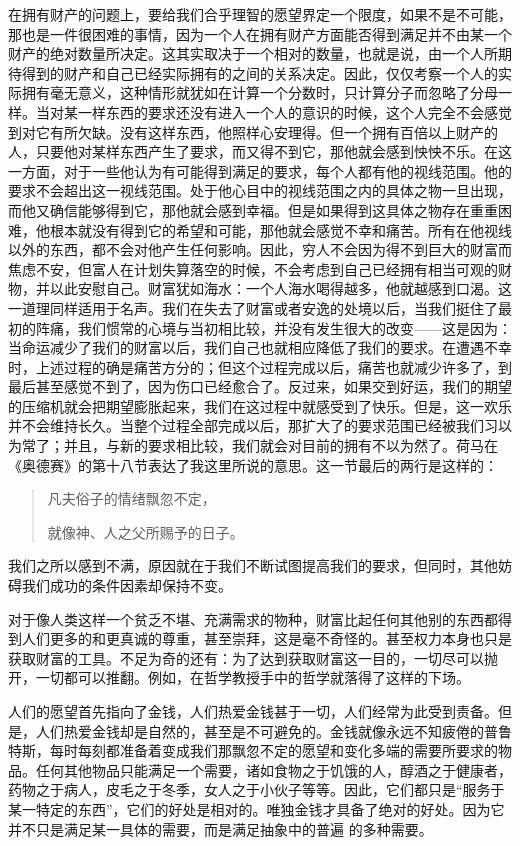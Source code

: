 \documentclass[12pt,oneside]{book}
\begin{document}
在拥有财产的问题上，要给我们合乎理智的愿望界定一个限度，如果不是不可能，那也是一件很困难的事情，因为一个人在拥有财产方面能否得到满足并不由某一个财产的绝对数量所决定。这其实取决于一个相对的数量，也就是说，由一个人所期待得到的财产和自己已经实际拥有的之间的关系决定。因此，仅仅考察一个人的实际拥有毫无意义，这种情形就犹如在计算一个分数时，只计算分子而忽略了分母一样。当对某一样东西的要求还没有进入一个人的意识的时候，这个人完全不会感觉到对它有所欠缺。没有这样东西，他照样心安理得。但一个拥有百倍以上财产的人，只要他对某样东西产生了要求，而又得不到它，那他就会感到怏怏不乐。在这一方面，对于一些他认为有可能得到满足的要求，每个人都有他的视线范围。他的要求不会超出这一视线范围。处于他心目中的视线范围之内的具体之物一旦出现，而他又确信能够得到它，那他就会感到幸福。但是如果得到这具体之物存在重重困难，他根本就没有得到它的希望和可能，那他就会感觉不幸和痛苦。所有在他视线以外的东西，都不会对他产生任何影响。因此，穷人不会因为得不到巨大的财富而焦虑不安，但富人在计划失算落空的时候，不会考虑到自己已经拥有相当可观的财物，并以此安慰自己。财富犹如海水：一个人海水喝得越多，他就越感到口渴。这一道理同样适用于名声。我们在失去了财富或者安逸的处境以后，当我们挺住了最初的阵痛，我们惯常的心境与当初相比较，并没有发生很大的改变——这是因为：当命运减少了我们的财富以后，我们自己也就相应降低了我们的要求。在遭遇不幸时，上述过程的确是痛苦方分的；但这个过程完成以后，痛苦也就减少许多了，到最后甚至感觉不到了，因为伤口已经愈合了。反过来，如果交到好运，我们的期望的压缩机就会把期望膨胀起来，我们在这过程中就感受到了快乐。但是，这一欢乐并不会维持长久。当整个过程全部完成以后，那扩大了的要求范围已经被我们习以为常了；并且，与新的要求相比较，我们就会对目前的拥有不以为然了。荷马在《奥德赛》的第十八节表达了我这里所说的意思。这一节最后的两行是这样的： 


\begin{quotation}
凡夫俗子的情绪飘忽不定，

就像神、人之父所赐予的日子。 
\end{quotation}
 

我们之所以感到不满，原因就在于我们不断试图提高我们的要求，但同时，其他妨碍我们成功的条件因素却保持不变。 

对于像人类这样一个贫乏不堪、充满需求的物种，财富比起任何其他别的东西都得到人们更多的和更真诚的尊重，甚至崇拜，这是毫不奇怪的。甚至权力本身也只是获取财富的工具。不足为奇的还有：为了达到获取财富这一目的，一切尽可以抛开，一切都可以推翻。例如，在哲学教授手中的哲学就落得了这样的下场。 

人们的愿望首先指向了金钱，人们热爱金钱甚于一切，人们经常为此受到责备。但是，人们热爱金钱却是自然的，甚至是不可避免的。金钱就像永远不知疲倦的普鲁特斯，每时每刻都准备着变成我们那飘忽不定的愿望和变化多端的需要所要求的物品。任何其他物品只能满足一个需要，诸如食物之于饥饿的人，醇酒之于健康者，药物之于病人，皮毛之于冬季，女人之于小伙子等等。因此，它们都只是“服务于某一特定的东西”，它们的好处是相对的。唯独金钱才具备了绝对的好处。因为它并不只是满足某一具体的需要，而是满足抽象中的普遍
的多种需要。 
\end{document}
